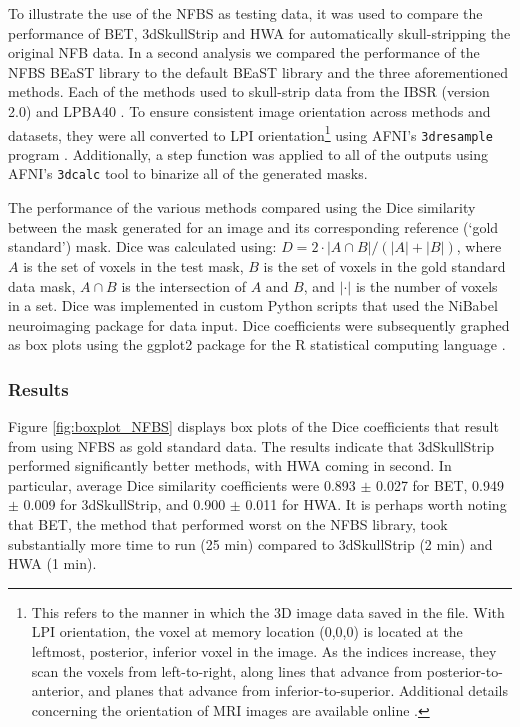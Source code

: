 To illustrate the use of the NFBS as testing data, it was used to compare the performance of BET, 3dSkullStrip and HWA for automatically skull-stripping the original NFB data. In a second analysis we compared the performance of the NFBS BEaST library to the default BEaST library and the three aforementioned methods. Each of the methods \DIFdelbegin {}\DIFdelend \DIFaddbegin {}\DIFaddend used to skull-strip data from the IBSR (version 2.0) and LPBA40 \cite{IBSR, lpba40}. To ensure consistent image orientation across methods and datasets, they were all converted to LPI orientation\footnote{This refers to the manner in which the 3D image data \DIFdelbegin {}\DIFdelend \DIFaddbegin {}\DIFaddend saved in the file. With LPI orientation, the voxel at memory location (0,0,0) is located at the leftmost, posterior, inferior voxel in the image. As the indices increase, they scan the voxels from left-to-right, along lines that advance from posterior-to-anterior, and planes that advance from inferior-to-superior.
Additional details concerning the orientation of MRI images are available online \cite{orientation}.} using AFNI's \texttt{3dresample} program \cite{afni}. Additionally, a step function was applied to all of the outputs using AFNI's \texttt{3dcalc} tool to binarize all of the generated masks.

\par The performance of the various methods \DIFdelbegin {}\DIFdelend \DIFaddbegin {}\DIFaddend compared using the Dice similarity \cite{Dice1945} between the mask generated for an image and its corresponding reference (`gold standard') mask. Dice was calculated using: $D = 2 \cdot | A \cap B | / (|A| + |B|)$, where $A$ is the set of voxels in the test mask, $B$ is the set of voxels in the gold standard data mask, $A \cap B$ is the intersection of $A$ and $B$, and $|\cdot|$ is the number of voxels in a set. Dice was implemented in custom Python scripts that used the NiBabel neuroimaging package \cite{NiBabel} for data input. Dice coefficients were subsequently graphed as box plots using the ggplot2 package \cite{Wickham2009} for the R statistical computing language \cite{R}.


\subsubsection*{Results}
Figure \ref{fig:boxplot_NFBS} displays box plots of the Dice coefficients that result from using NFBS as gold standard data. The results indicate that 3dSkullStrip performed significantly better \DIFdelbegin {}\DIFdelend \DIFaddbegin {}\DIFaddend methods, with HWA coming in second. In particular, average Dice similarity coefficients were 0.893 $\pm$ 0.027 for BET, 0.949 $\pm$ 0.009 for 3dSkullStrip, and 0.900 $\pm$ 0.011 for HWA. It is perhaps worth noting that BET, the method that performed worst on the NFBS library, took substantially more time to run (25 min) compared to 3dSkullStrip (2 min) and HWA (1 min).

